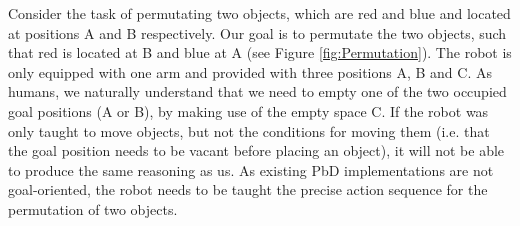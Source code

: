 

Consider the task of permutating two objects, which are red and blue and located at positions A and B respectively. Our goal is to permutate the two objects, such that red is located at B and blue at A (see Figure \ref{fig:Permutation}). The robot is only equipped with one arm and provided with three positions A, B and C. As humans, we naturally understand that we need to empty one of the two occupied goal positions (A or B), by making use of the empty space C. If the robot was only taught to move objects, but not the conditions for moving them (i.e. that the goal position needs to be vacant before placing an object), it will not be able to produce the same reasoning as us. As existing PbD implementations are not goal-oriented, the robot needs to be taught the precise action sequence for the permutation of two objects.

